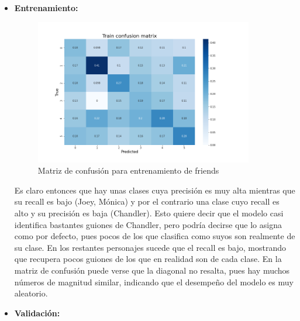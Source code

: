 \begin{itemize}
    \item \textbf{Entrenamiento:}
    

    \begin{figure}[H]
        \centering
        \includegraphics[width = 0.9\textwidth]{results/friends/deepModels/Train.png}
        \caption{Matriz de confusión para entrenamiento de friends}
        \label{fig:my_label}
    \end{figure}
    
    Es claro entonces que hay unas clases cuya precisión es muy alta mientras que su recall es bajo (Joey, Mónica) y por el contrario una clase cuyo recall es alto y su precisión es baja (Chandler). Esto quiere decir que el modelo casi identifica bastantes guiones de Chandler, pero podría decirse que lo asigna como por defecto, pues pocos de los que clasifica como suyos son realmente de su clase. En los restantes personajes sucede que el recall es bajo, mostrando que recupera pocos guiones de los que en realidad son de cada clase. En la matriz de confusión puede verse que la diagonal no resalta, pues hay muchos números de magnitud similar, indicando que el desempeño del modelo es muy aleatorio.

    \item \textbf{Validación:}
    


\end{itemize}
